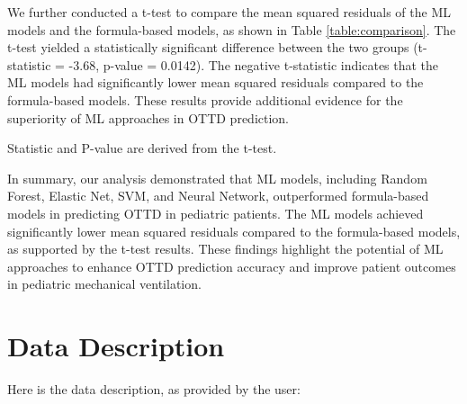 \documentclass[11pt]{article}
\begin{document}
We further conducted a t-test to compare the mean squared residuals of the ML models and the formula-based models, as shown in Table \ref{table:comparison}. The t-test yielded a statistically significant difference between the two groups (t-statistic = -3.68, p-value = 0.0142). The negative t-statistic indicates that the ML models had significantly lower mean squared residuals compared to the formula-based models. These results provide additional evidence for the superiority of ML approaches in OTTD prediction.

\begin{table}[h]
\caption{T-test comparing Machine Learning and Formula-based Models}
\label{table:comparison}
\begin{threeparttable}
\renewcommand{\TPTminimum}{\linewidth}
\begin{tablenotes}
\footnotesize
\item Statistic and P-value are derived from the t-test.
\end{tablenotes}
\end{threeparttable}
\end{table}


In summary, our analysis demonstrated that ML models, including Random Forest, Elastic Net, SVM, and Neural Network, outperformed formula-based models in predicting OTTD in pediatric patients. The ML models achieved significantly lower mean squared residuals compared to the formula-based models, as supported by the t-test results. These findings highlight the potential of ML approaches to enhance OTTD prediction accuracy and improve patient outcomes in pediatric mechanical ventilation.


\clearpage
\appendix

\section{Data Description} \label{sec:data_description} Here is the data description, as provided by the user:
\end{document}
